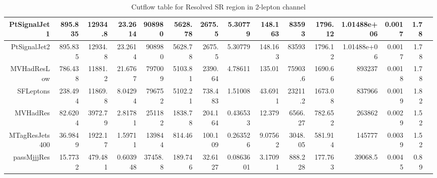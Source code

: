 \begin{table}[ht!]
\begin{center}
{\begin{tabular}{ r ||  r  r  r  r  r  r  r  r  r  || r r r r r |}
PtSignalJet1 & 895.835 & 12934.8 & 23.2614 & 908980 & 5628.78 & 2675.5 & 5.30779 & 148.163 & 83593 & 1796.12 &1.01488e+06&0.0017 & 1.78\tabularnewline \hline
PtSignalJet2 & 895.835 & 12934.8 & 23.2614 & 908980 & 5628.78 & 2675.5 & 5.30779 & 148.163 & 83593 & 1796.12 &1.01488e+06&0.0017 & 1.78\tabularnewline \hline
MVHadResLow & 786.438 & 11881.2 & 21.6767 & 797009 & 5103.81 & 2390.64 & 4.78611 & 135.01 & 75903.6 & 1690.66&893237&0.0018 & 1.78\tabularnewline \hline
SFLeptons & 238.494 & 11869.8 & 8.04294 & 796752 & 5102.21 & 738.483 & 1.51008 & 43.6911 & 23211.2 & 1673.08&837966&0.0019 & 1.82\tabularnewline \hline
MVHadRes & 82.6204 & 3972.79 & 2.81781 & 251182 & 1838.78 & 204.164 & 0.436533 & 12.379 & 6566.27 & 782.652&263862&0.0029 & 1.52\tabularnewline \hline
MTagResJets400 & 36.9849 & 1922.17 & 1.59711 & 139844 & 814.46 & 100.109 & 0.263526 & 9.07562 & 3048.05 & 581.914&145777&0.0039 & 1.52\tabularnewline \hline
passMjjjRes & 15.7732 & 479.481 & 0.603948 & 37458.8 & 189.746 & 32.6127 & 0.0863601 & 3.17091 & 888.228 & 177.763&39068.5&0.0045 & 0.89\tabularnewline \hline
\end{tabular}
}
\caption{Cutflow table for Resolved SR region in 2-lepton channel}
\label{tab:2lep_ResolvedSR}
\end{center}
\end{table}

